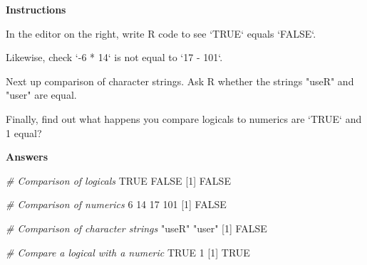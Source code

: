 \documentclass[]{article}
\newcommand{\hlnum}[1]{\textcolor[rgb]{0.816,0.125,0.439}{#1}}%
\newcommand{\hlstr}[1]{\textcolor[rgb]{0.251,0.627,0.251}{#1}}%
\newcommand{\hlcom}[1]{\textcolor[rgb]{0.502,0.502,0.502}{\textit{#1}}}%
\newcommand{\hlstd}[1]{\textcolor[rgb]{0.251,0.251,0.251}{#1}}%
\newcommand{\hlkwc}[1]{\textcolor[rgb]{0.251,0.251,0.251}{#1}}%
\newenvironment{Shaded}{\begin{myshaded}}{\end{myshaded}}
\newcommand{\DataTypeTok}[1]{\hlkwc{#1}}
\newcommand{\DecValTok}[1]{\hlnum{#1}}
\newcommand{\StringTok}[1]{\hlstr{#1}}
\newcommand{\CommentTok}[1]{\hlcom{#1}}
\newcommand{\OtherTok}[1]{{#1}}
\newcommand{\NormalTok}[1]{\hlstd{#1}}
\begin{document}
\textbf{Instructions}

\begin{Shaded}
\begin{Highlighting}[]

\OperatorTok{*}\StringTok{ }\NormalTok{In the editor on the right, write R code to see } \StringTok{`}\DataTypeTok{TRUE}\StringTok{`}\NormalTok{ equals }\StringTok{`}\DataTypeTok{FALSE}\StringTok{`}\NormalTok{.}

\OperatorTok{*}\StringTok{ }\NormalTok{Likewise, check } \StringTok{`}\DataTypeTok{-6 * 14}\StringTok{`}\NormalTok{ is not equal to }\StringTok{`}\DataTypeTok{17 - 101}\StringTok{`}\NormalTok{.}

\OperatorTok{*}\StringTok{ }\NormalTok{Next up}\OperatorTok{:}\StringTok{ }\NormalTok{comparison of character strings. Ask R whether the strings }\StringTok{"useR"}\NormalTok{ and }\StringTok{"user"}\NormalTok{ are equal.}

\OperatorTok{*}\StringTok{ }\NormalTok{Finally, find out what happens }\NormalTok{ you compare logicals to numerics}\OperatorTok{:}\StringTok{ }\NormalTok{are }\StringTok{`}\DataTypeTok{TRUE}\StringTok{`}\NormalTok{ and }\DecValTok{1}\NormalTok{ equal?}
\end{Highlighting}
\end{Shaded}

\textbf{Answers}

\begin{Shaded}
\begin{Highlighting}[]
\CommentTok{# Comparison of logicals}
\OtherTok{TRUE} \OperatorTok{==}\StringTok{ }\OtherTok{FALSE}
\NormalTok{   [}\DecValTok{1}\NormalTok{] }\OtherTok{FALSE}

\CommentTok{# Comparison of numerics}
\OperatorTok{-}\DecValTok{6} \OperatorTok{*}\StringTok{ }\DecValTok{14} \OperatorTok{!=}\StringTok{ }\DecValTok{17} \OperatorTok{-}\StringTok{ }\DecValTok{101}
\NormalTok{   [}\DecValTok{1}\NormalTok{] }\OtherTok{FALSE}

\CommentTok{# Comparison of character strings}
\StringTok{"useR"} \OperatorTok{==}\StringTok{ "user"}
\NormalTok{   [}\DecValTok{1}\NormalTok{] }\OtherTok{FALSE}

\CommentTok{# Compare a logical with a numeric}
\OtherTok{TRUE} \OperatorTok{==}\StringTok{ }\DecValTok{1}
\NormalTok{   [}\DecValTok{1}\NormalTok{] }\OtherTok{TRUE}
\end{Highlighting}
\end{Shaded}
\end{document}
